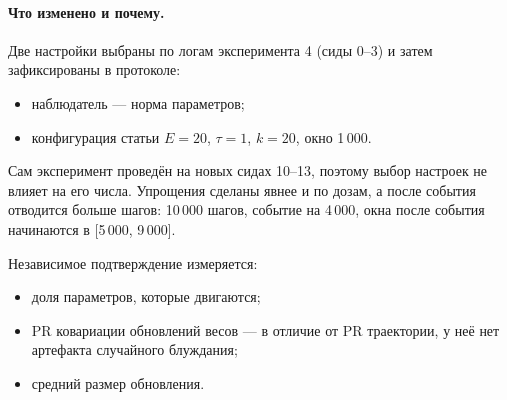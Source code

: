 \documentclass[10pt,a4paper]{article}
\begin{document}
\paragraph{Что изменено и почему.} Две настройки выбраны по логам эксперимента 4
(сиды 0--3) и затем зафиксированы в протоколе:
\begin{itemize}\setlength\itemsep{0pt}
\item наблюдатель --- норма параметров;
\item конфигурация статьи $E=20$, $\tau=1$, $k=20$, окно 1\,000.
\end{itemize}
Сам эксперимент проведён на новых сидах 10--13, поэтому выбор настроек не влияет
на его числа. Упрощения сделаны явнее и по дозам, а после события отводится больше
шагов: 10\,000 шагов, событие на 4\,000, окна после события начинаются в
[5\,000, 9\,000].

Независимое подтверждение измеряется:
\begin{itemize}\setlength\itemsep{0pt}
\item доля параметров, которые двигаются;
\item PR ковариации обновлений весов --- в отличие от PR траектории, у неё нет
  артефакта случайного блуждания;
\item средний размер обновления.
\end{itemize}
\end{document}
